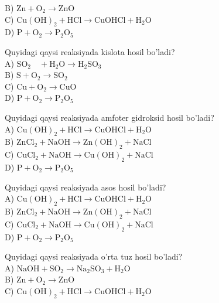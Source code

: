 B) $\mathrm{Zn}+\mathrm{O}_{2} \rightarrow \mathrm{ZnO}$\\
C) $\mathrm{Cu}(\mathrm{OH})_{2}+\mathrm{HCl} \rightarrow \mathrm{CuOHCl}+\mathrm{H}_{2} \mathrm{O}$\\
D) $\mathrm{P}+\mathrm{O}_{2} \rightarrow \mathrm{P}_{2} \mathrm{O}_{5}$
  \item Quyidagi qaysi reaksiyada kislota hosil bo'ladi?\\
A) $\mathrm{SO}_{2} \quad+\mathrm{H}_{2} \mathrm{O} \rightarrow \mathrm{H}_{2} \mathrm{SO}_{3}$\\
B) $\mathrm{S}+\mathrm{O}_{2} \rightarrow \mathrm{SO}_{2}$\\
C) $\mathrm{Cu}+\mathrm{O}_{2} \rightarrow \mathrm{CuO}$\\
D) $\mathrm{P}+\mathrm{O}_{2} \rightarrow \mathrm{P}_{2} \mathrm{O}_{5}$
  \item Quyidagi qaysi reaksiyada amfoter gidroksid hosil bo'ladi?\\
A) $\mathrm{Cu}(\mathrm{OH})_{2}+\mathrm{HCl} \rightarrow \mathrm{CuOHCl}+\mathrm{H}_{2} \mathrm{O}$\\
B) $\mathrm{ZnCl}_{2}+\mathrm{NaOH} \rightarrow \mathrm{Zn}(\mathrm{OH})_{2}+\mathrm{NaCl}$\\
C) $\mathrm{CuCl}_{2}+\mathrm{NaOH} \rightarrow \mathrm{Cu}(\mathrm{OH})_{2}+\mathrm{NaCl}$\\
D) $\mathrm{P}+\mathrm{O}_{2} \rightarrow \mathrm{P}_{2} \mathrm{O}_{5}$
  \item Quyidagi qaysi reaksiyada asos hosil bo'ladi?\\
A) $\mathrm{Cu}(\mathrm{OH})_{2}+\mathrm{HCl} \rightarrow \mathrm{CuOHCl}+\mathrm{H}_{2} \mathrm{O}$\\
B) $\mathrm{ZnCl}_{2}+\mathrm{NaOH} \rightarrow \mathrm{Zn}(\mathrm{OH})_{2}+\mathrm{NaCl}$\\
C) $\mathrm{CuCl}_{2}+\mathrm{NaOH} \rightarrow \mathrm{Cu}(\mathrm{OH})_{2}+\mathrm{NaCl}$\\
D) $\mathrm{P}+\mathrm{O}_{2} \rightarrow \mathrm{P}_{2} \mathrm{O}_{5}$
  \item Quyidagi qaysi reaksiyada o'rta tuz hosil bo'ladi?\\
A) $\mathrm{NaOH}+\mathrm{SO}_{2} \rightarrow \mathrm{Na}_{2} \mathrm{SO}_{3}+\mathrm{H}_{2} \mathrm{O}$\\
B) $\mathrm{Zn}+\mathrm{O}_{2} \rightarrow \mathrm{ZnO}$\\
C) $\mathrm{Cu}(\mathrm{OH})_{2}+\mathrm{HCl} \rightarrow \mathrm{CuOHCl}+\mathrm{H}_{2} \mathrm{O}$\\
